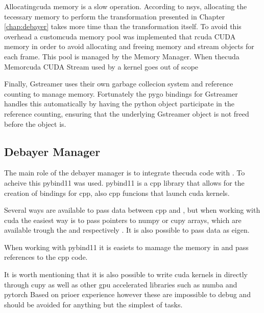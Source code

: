 Allocating\gls{cuda} memory is a slow operation.
According to \gls{nsys}, allocating the tecessary memory to perform the transformation presented in Chapter \ref{chap:debayer} takes more time than the transformation itself.
To avoid this overhead a custom\gls{cuda} memory pool was implemented that r\gls{cuda} CUDA memory in order to avoid allocating and freeing memory and stream objects for each frame.
This pool is managed by the Memory Manager.
When the\gls{cuda} Memor\gls{cuda} CUDA Stream used by a kernel goes out of scope

Finally, Gstreamer uses their own garbage collecion system and reference counting to manage memory.
Fortunately the \gls{pygo} bindings for Gstreamer handles this automatically by having the python object participate in the reference counting, ensuring that the underlying Gstreamer object is not freed before the \py object is.


\subsection{Debayer Manager}
The main role of the debayer manager is to integrate the\gls{cuda} code with \py.
To acheive this \gls{pybind11} was used.
\gls{pybind11} is a \gls{cpp} library that allows for the creation of \py bindings for \gls{cpp}, also \gls{cpp} funcions that launch \gls{cuda} kernels.

Several ways are available to pass data between \gls{cpp} and \py, but when working with \gls{cuda} the easiest way is to pass pointers to \gls{numpy} or \gls{cupy} arrays, which are available trough the  and  respectively \cite{numpyArrayInterfaceProtocol} \cite{cupyInteroperabilityCuPy12}.
It is also possible to pass data as \gls{eigen}.

When working with \gls{pybind11} it is easiets to mamage the memory in \py and pass references to the \gls{cpp} code.

It is worth mentioning that it is also possible to write \gls{cuda} kernels in \py directly through \gls{cupy} as well as other \gls{gpu} accelerated libraries such as \gls{numba} and \gls{pytorch}
Based on prioer experience however these are impossible to debug and should be avoided for anything but the simplest of tasks.